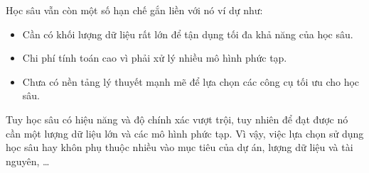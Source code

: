 Học sâu vẫn còn một số hạn chế gắn liền với nó ví dự như:
\begin{itemize}
    \item Cần có khối lượng dữ liệu rất lớn để tận dụng tối đa khả năng của học sâu.
    \item Chi phí tính toán cao vì phải xử lý nhiều mô hình phức tạp.
    \item Chưa có nền tảng lý thuyết mạnh mẽ để lựa chọn các công cụ tối ưu cho học sâu.
\end{itemize}

Tuy học sâu có hiệu năng và độ chính xác vượt trội, tuy nhiên để đạt được nó cần một lượng dữ liệu lớn và các mô hình phức tạp. Vì vậy, việc lựa chọn sử dụng học sâu hay khôn phụ thuộc nhiều vào mục tiêu của dự án, lượng dữ liệu và tài nguyên, \dots\cite{webpage10}
